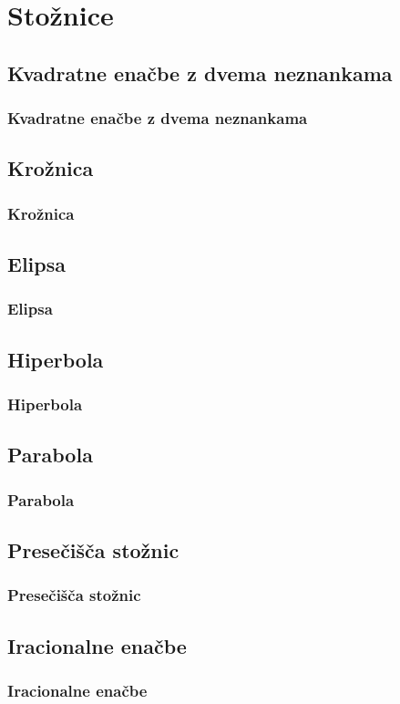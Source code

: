 \section{Stožnice}

\begin{frame}
    \sectionpage
\end{frame}

\begin{frame}
\end{frame}

    \subsection{Kvadratne enačbe z dvema neznankama}

        \begin{frame}
            \frametitle{Kvadratne enačbe z dvema neznankama}
        \end{frame}

    \subsection{Krožnica}

        \begin{frame}
            \frametitle{Krožnica}
        \end{frame}

    \subsection{Elipsa}

        \begin{frame}
            \frametitle{Elipsa}
        \end{frame}

    \subsection{Hiperbola}

        \begin{frame}
            \frametitle{Hiperbola}
        \end{frame}

    \subsection{Parabola}

        \begin{frame}
            \frametitle{Parabola}
        \end{frame}

    \subsection{Presečišča stožnic}

        \begin{frame}
            \frametitle{Presečišča stožnic}
        \end{frame}

    \subsection{Iracionalne enačbe}

        \begin{frame}
            \frametitle{Iracionalne enačbe}
        \end{frame}
